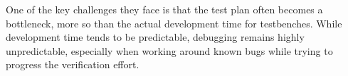\documentclass[11pt,a4paper]{report}
\begin{document}
One of the key challenges they face is that the test plan often becomes a bottleneck, more so than the actual
development time for testbenches. While development time tends to be predictable, debugging remains highly
unpredictable, especially when working around known bugs while trying to progress the verification effort.

\end{document}
